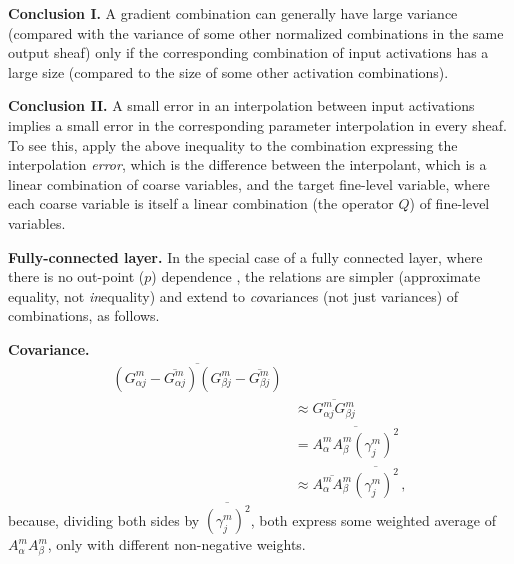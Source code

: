 \documentclass{article} %
\begin{document}
{\bf Conclusion I.} A gradient combination can generally have large variance (compared with the variance of some other normalized combinations in the same output sheaf) only if the corresponding combination of input activations has a large size (compared to the size of some other activation combinations).

{\bf Conclusion II.} A small error in an interpolation between input activations implies a small error in the corresponding parameter interpolation in every sheaf. To see this, apply the above inequality to the combination expressing the interpolation {\it error}, which is the difference between the interpolant, which is a linear combination of coarse variables, and the target fine-level variable, where each coarse variable is itself a linear combination (the operator $Q$) of fine-level variables.

{\bf Fully-connected layer.} In the special case of a fully connected layer, where there is no out-point ($p$) dependence , the relations are simpler (approximate equality, not {\it in}equality) and extend to {\it co}variances (not just variances) of combinations, as follows.

{\bf Covariance.}
\begin{equation}
    \begin{split}
    \overline{\left(G^m_{\alpha j} - \overline{G^m_{\alpha j}}\right) \left(G^m_{\beta j} - \overline{G^m_{\beta j}}\right)} & \\
     & \approx \overline{G^m_{\alpha j} G^m_{\beta j}} \\
     & = \overline{A^m_{\alpha} A^m_{\beta} \left(\gamma^m_j\right)^2} \\
     & \approx \overline{A^m_{\alpha} A^m_{\beta}} \overline{\left(\gamma^m_j\right)^2}\,,
    \end{split}
    \label{g_cov}
\end{equation}
because, dividing both sides by $\overline{\left(\gamma^m_j\right)^2}$, both express some weighted average of $A^m_{\alpha} A^m_{\beta}$, only with different non-negative weights.

%



\end{document}
